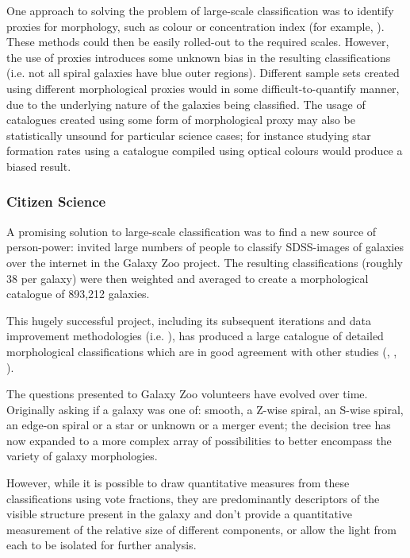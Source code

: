 \documentclass[../main.tex]{subfiles}
\begin{document}
One approach to solving the problem of large-scale classification was to identify proxies for morphology, such as colour or concentration index (for example, \citet{Scarlata2007:astro-ph/0701746v2}). These methods could then be easily rolled-out to the required scales. However, the use of proxies introduces some unknown bias in the resulting classifications (i.e. not all spiral galaxies have blue outer regions). Different sample sets created using different morphological proxies would in some difficult-to-quantify manner, due to the underlying nature of the galaxies being classified. The usage of catalogues created using some form of morphological proxy may also be statistically unsound for particular science cases; for instance studying star formation rates using a catalogue compiled using optical colours would produce a biased result.

\subsubsection{Citizen Science}
A promising solution to large-scale classification was to find a new source of person-power: \cite{Lintott2008:0804.4483v1} invited large numbers of people to classify SDSS-images of galaxies over the internet in the Galaxy Zoo project. The resulting classifications (roughly 38 per galaxy) were then weighted and averaged to create a morphological catalogue of 893,212 galaxies.

This hugely successful project, including its subsequent iterations and data improvement methodologies (i.e. \citealt{Hart2016:1607.01019v1}), has produced a large catalogue of detailed morphological classifications which are in good agreement with other studies (\citealt{Willett2013:1308.3496v2}, \citealt{Simmons2014:1409.1214v1}, \citealt{Willett2016:1610.03068v2}).

The questions presented to Galaxy Zoo volunteers have evolved over time. Originally asking if a galaxy was one of: smooth, a Z-wise spiral, an S-wise spiral, an edge-on spiral or a star or unknown or a merger event; the decision tree has now expanded to a more complex array of possibilities to better encompass the variety of galaxy morphologies.

However, while it is possible to draw quantitative measures from these classifications using vote fractions, they are predominantly descriptors of the visible structure present in the galaxy and don't provide a quantitative measurement of the relative size of different components, or allow the light from each to be isolated for further analysis.
\end{document}
